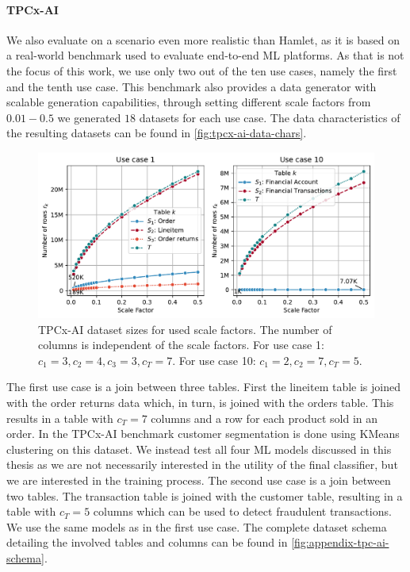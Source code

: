 \paragraph{TPCx-AI \cite{tpcx-ai}} We also evaluate on a scenario even more realistic than Hamlet, as it is based on a real-world benchmark used to evaluate end-to-end ML platforms. As that is not the focus of this work, we use only two out of the ten use cases, namely the first and the tenth use case. This benchmark also provides a data generator with scalable generation capabilities, through setting different scale factors from $0.01-0.5$ we generated $18$ datasets for each use case. The data characteristics of the resulting datasets can be found in \autoref{fig:tpcx-ai-data-chars}.
\begin{figure}
  \centering
  \includegraphics[width=\linewidth]{chapters/06_evaluation/figures/tpcx-ai-data-chars.pdf}
  \caption[TPCx-AI dataset sizes for used scale factors.]{TPCx-AI dataset sizes for used scale factors. The number of columns is independent of the scale factors. For use case 1: $c_1=3, c_2=4, c_3=3, c_T=7$. For use case 10: $c_1=2, c_2=7, c_T=5$.}
  \label{fig:tpcx-ai-data-chars}
\end{figure}

The first use case is a join between three tables. First the lineitem table is joined with the order returns data which, in turn, is joined with the orders table. This results in a table with $c_T=7$ columns and a row for each product sold in an order. In the TPCx-AI benchmark customer segmentation is done using KMeans clustering on this dataset. We instead test all four ML models discussed in this thesis as we are not necessarily interested in the utility of the final classifier, but we are interested in the training process. The second use case is a join between two tables. The transaction table is joined with the customer table, resulting in a table with $c_T=5$ columns which can be used to detect fraudulent transactions. We use the same models as in the first use case. The complete dataset schema detailing the involved tables and columns can be found in \autoref{fig:appendix-tpc-ai-schema}.



